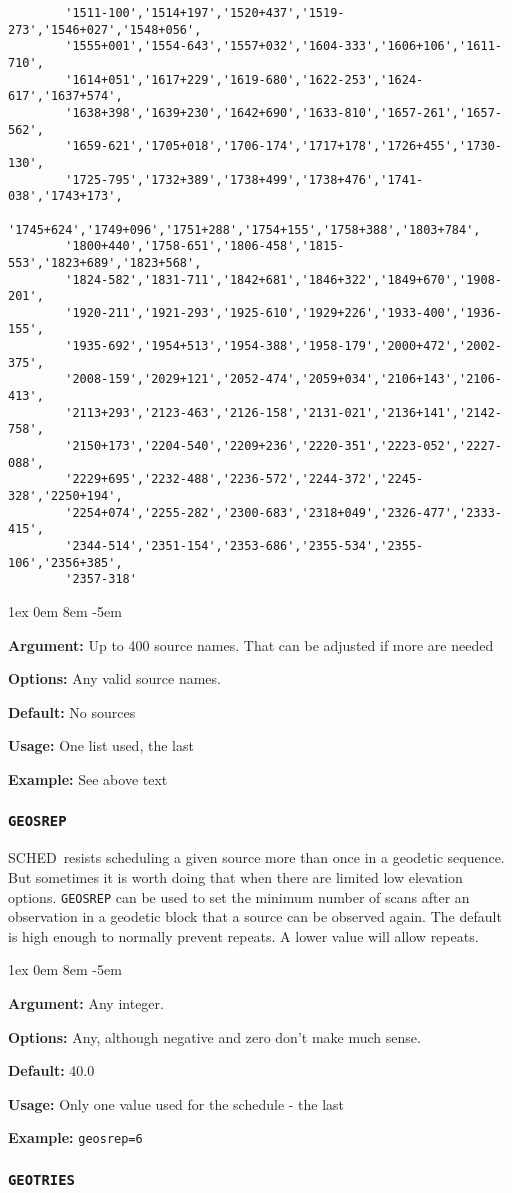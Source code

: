 \documentclass{report}
\newcommand{\schedb}{{\sc SCHED~}}
\newcommand{\rcwbox}[5]{
  \begin{list}{}{\parsep 1ex  \itemsep 0em
                 \leftmargin 8em  \itemindent -5em }
    \item {\bf Argument:} #1
    \item {\bf Options:}  #2
    \item {\bf Default:}  #3
    \item {\bf Usage:}    #4
    \item {\bf Example:}  #5
  \end{list}
}
\begin{document}
\begin{verbatim}
        '1511-100','1514+197','1520+437','1519-273','1546+027','1548+056',
        '1555+001','1554-643','1557+032','1604-333','1606+106','1611-710',
        '1614+051','1617+229','1619-680','1622-253','1624-617','1637+574',
        '1638+398','1639+230','1642+690','1633-810','1657-261','1657-562',
        '1659-621','1705+018','1706-174','1717+178','1726+455','1730-130',
        '1725-795','1732+389','1738+499','1738+476','1741-038','1743+173',
        '1745+624','1749+096','1751+288','1754+155','1758+388','1803+784',
        '1800+440','1758-651','1806-458','1815-553','1823+689','1823+568',
        '1824-582','1831-711','1842+681','1846+322','1849+670','1908-201',
        '1920-211','1921-293','1925-610','1929+226','1933-400','1936-155',
        '1935-692','1954+513','1954-388','1958-179','2000+472','2002-375',
        '2008-159','2029+121','2052-474','2059+034','2106+143','2106-413',
        '2113+293','2123-463','2126-158','2131-021','2136+141','2142-758',
        '2150+173','2204-540','2209+236','2220-351','2223-052','2227-088',
        '2229+695','2232-488','2236-572','2244-372','2245-328','2250+194',
        '2254+074','2255-282','2300-683','2318+049','2326-477','2333-415',
        '2344-514','2351-154','2353-686','2355-534','2355-106','2356+385',
        '2357-318'

\end{verbatim}

\rcwbox
{Up to 400 source names.  That can be adjusted if more are needed}
{Any valid source names.}
{No sources}
{One list used, the last}
{See above text}

\subsubsection{\label{MP:GEOSREP}{\tt GEOSREP}}

\schedb resists scheduling a given source more than once in a
geodetic sequence.  But sometimes it is worth doing that when there
are limited low elevation options.  {\tt GEOSREP} can be used to
set the minimum number of scans after an observation in a geodetic
block that a source can be observed again.  The default is high
enough to normally prevent repeats.  A lower value will allow repeats.

\rcwbox
{Any integer.}
{Any, although negative and zero don't make much sense.}
{40.0}
{Only one value used for the schedule - the last}
{{\tt geosrep=6}}


\subsubsection{\label{MP:GEOTRIES}{\tt GEOTRIES}}
\end{document}

